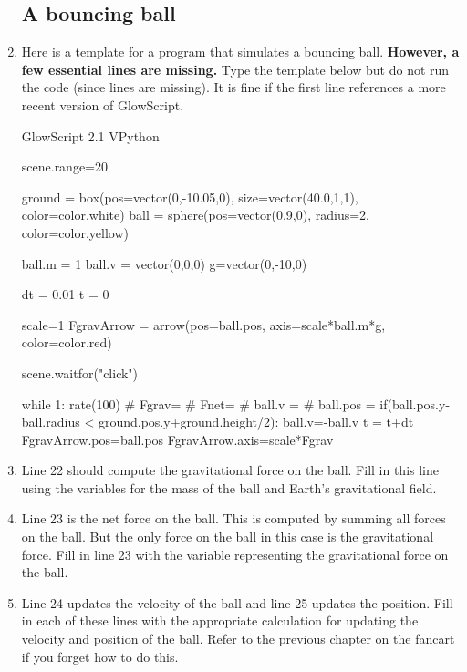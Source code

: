 \begin{enumerate}

\subsection*{A bouncing ball}

\item Here is a template for a program that simulates a bouncing ball. {\bf However, a few essential lines are missing.} Type the template below but do not run the code (since lines are missing). It is fine if the first line references a more recent version of GlowScript.

\begin{vpythonblock}
GlowScript 2.1 VPython

scene.range=20

ground = box(pos=vector(0,-10.05,0), size=vector(40.0,1,1), color=color.white)
ball = sphere(pos=vector(0,9,0), radius=2, color=color.yellow)

ball.m = 1
ball.v = vector(0,0,0)
g=vector(0,-10,0)

dt = 0.01
t = 0

scale=1
FgravArrow = arrow(pos=ball.pos, axis=scale*ball.m*g, color=color.red)

scene.waitfor("click")

while 1:
    rate(100)
#    Fgrav=
#    Fnet=
#    ball.v = 
#    ball.pos = 
    if(ball.pos.y-ball.radius < ground.pos.y+ground.height/2):
            ball.v=-ball.v
    t = t+dt
    FgravArrow.pos=ball.pos
    FgravArrow.axis=scale*Fgrav
\end{vpythonblock}


\item Line 22 should compute the gravitational force on the ball. Fill in this line using the variables for the mass of the ball and Earth's gravitational field.

\item Line 23 is the net force on the ball. This is computed by summing all forces on the ball. But the only force on the ball in this case is the gravitational force. Fill in line 23 with the variable representing the gravitational force on the ball.

\item Line 24 updates the velocity of the ball and line 25 updates the position. Fill in each of these lines with the appropriate calculation for updating the velocity and position of the ball. Refer to the previous chapter on the fancart if you forget how to do this.


\end{enumerate}
